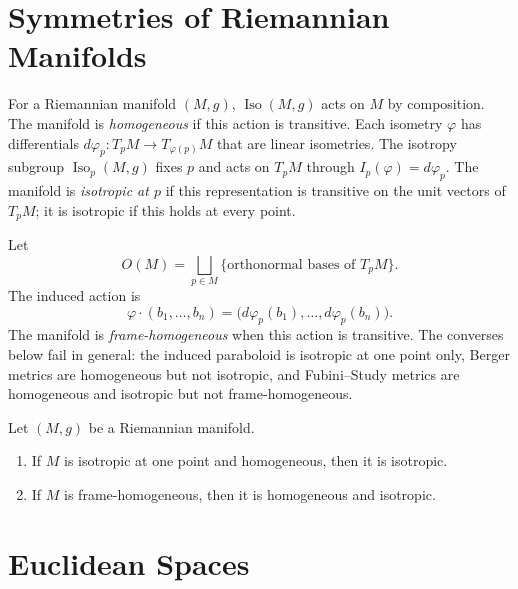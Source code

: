 
\section{Symmetries of Riemannian Manifolds}

For a Riemannian manifold $(M,g)$, $\operatorname{Iso}(M,g)$ acts on $M$ by composition. The manifold is \emph{homogeneous} if this action is transitive. Each isometry $\varphi$ has differentials $d\varphi_p:T_pM\to T_{\varphi(p)}M$ that are linear isometries. The isotropy subgroup $\operatorname{Iso}_p(M,g)$ fixes $p$ and acts on $T_pM$ through $I_p(\varphi)=d\varphi_p$. The manifold is \emph{isotropic at $p$} if this representation is transitive on the unit vectors of $T_pM$; it is isotropic if this holds at every point.

Let
\[
O(M)=\bigsqcup_{p\in M}\{\text{orthonormal bases of }T_pM\}.
\]
The induced action is
\begin{equation}
\varphi\cdot(b_1,\ldots,b_n)=\bigl(d\varphi_p(b_1),\ldots,d\varphi_p(b_n)\bigr).\tag{3.1}
\end{equation}
The manifold is \emph{frame-homogeneous} when this action is transitive. The converses below fail in general: the induced paraboloid is isotropic at one point only, Berger metrics are homogeneous but not isotropic, and Fubini--Study metrics are homogeneous and isotropic but not frame-homogeneous.

\begin{proposition}\label{prop:frame-homogeneous-manifolds}
Let $(M,g)$ be a Riemannian manifold.
\begin{enumerate}
\item[(a)] If $M$ is isotropic at one point and homogeneous, then it is isotropic.
\item[(b)] If $M$ is frame-homogeneous, then it is homogeneous and isotropic.
\end{enumerate}
\end{proposition}

\section{Euclidean Spaces}

